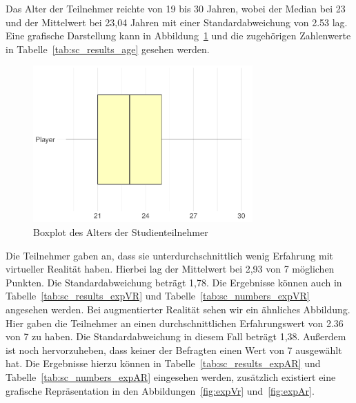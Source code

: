 Das Alter der Teilnehmer reichte von 19 bis 30 Jahren, wobei der Median bei 23 und der Mittelwert bei 23,04 Jahren mit einer Standardabweichung von 2.53 lag. Eine grafische Darstellung kann in Abbildung~\ref{fig:age} und die zugehörigen Zahlenwerte in Tabelle~\ref{tab:sc_results_age} gesehen werden.

\begin{figure}[H]
	\centering
	\includegraphics[width=0.75\textwidth]{./_StudyResults/age}
	\caption{Boxplot des Alters der Studienteilnehmer}
	\label{fig:age}
\end{figure}

Die Teilnehmer gaben an, dass sie unterdurchschnittlich wenig Erfahrung mit virtueller Realität haben. Hierbei lag der Mittelwert bei 2,93 von 7 möglichen Punkten. Die Standardabweichung beträgt 1,78. Die Ergebnisse können auch in Tabelle~\ref{tab:sc_results_expVR} und Tabelle~\ref{tab:sc_numbers_expVR} angesehen werden. Bei augmentierter Realität sehen wir ein ähnliches Abbildung. Hier gaben die Teilnehmer an einen durchschnittlichen Erfahrungswert von 2.36 von 7 zu haben. Die Standardabweichung in diesem Fall beträgt 1,38. Außerdem ist noch hervorzuheben, dass keiner der Befragten einen Wert von 7 ausgewählt hat. Die Ergebnisse hierzu können in Tabelle~\ref{tab:sc_results_expAR} und Tabelle~\ref{tab:sc_numbers_expAR} eingesehen werden, zusätzlich existiert eine grafische Repräsentation in den Abbildungen~\ref{fig:expVr} und~\ref{fig:expAr}.


